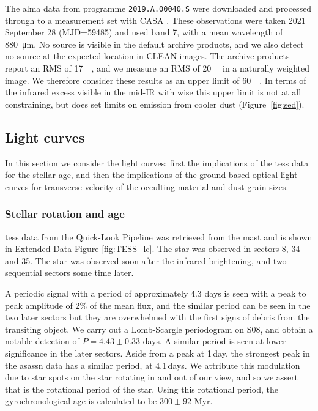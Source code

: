 \documentclass[sn-nature,oneside]{sn-jnl}%
\begin{document}

The \gls{alma} data from programme \texttt{2019.A.00040.S} were downloaded and processed through to a measurement set with CASA \cite{2007ASPC..376..127M}.
%
These observations were taken 2021 September 28 (MJD=59485) and used band 7, with a mean wavelength of \SI{880}{\micro\metre}.
%
No source is visible in the default archive products, and we also detect no source at the expected location in CLEAN images.
%
The archive products report an RMS of \SI{17}{\micro\jansky}, and we measure an RMS of \SI{20}{\micro\jansky} in a naturally weighted image.
%
We therefore consider these results as an upper limit of \SI{60}{\micro\jansky}.
%
In terms of the infrared excess visible in the mid-IR with \gls{wise} this upper limit is not at all constraining, but does set limits on emission from cooler dust (Figure~\ref{fig:sed}).

\subsection*{Light curves}

In this section we consider the light curves; first the implications of the \gls{tess} data for the stellar age, and then the implications of the ground-based optical light curves for transverse velocity of the occulting material and dust grain sizes.

\subsubsection*{Stellar rotation and age}

\gls{tess} data from the Quick-Look Pipeline \cite{2020RNAAS...4..204H,2021RNAAS...5..234K} was retrieved from the \gls{mast} and is shown in Extended Data Figure \ref{fig:TESS_lc}.
%
The star was observed in sectors 8, 34 and 35.
%
The star was observed soon after the infrared brightening, and two sequential sectors some time later.

A periodic signal with a period of approximately 4.3 days is seen with a peak to peak amplitude of 2\% of the mean flux, and the similar period can be seen in the two later sectors but they are overwhelmed with the first signs of debris from the transiting object.
%
We carry out a Lomb-Scargle periodogram on S08, and obtain a notable detection of $P=4.43\pm 0.33$ days.
%
A similar period is seen at lower significance in the later sectors.
%
Aside from a peak at 1\,day, the  strongest peak in the \gls{asassn} data has a similar period, at 4.1\,days.
%
We attribute this modulation due to star spots on the star rotating in and out of our view, and so we assert that is the rotational period of the star.
%
Using this rotational period, the gyrochronological age \cite{Bouma23,Kounkel22} is calculated to be $300\pm92$ Myr.
\end{document}
